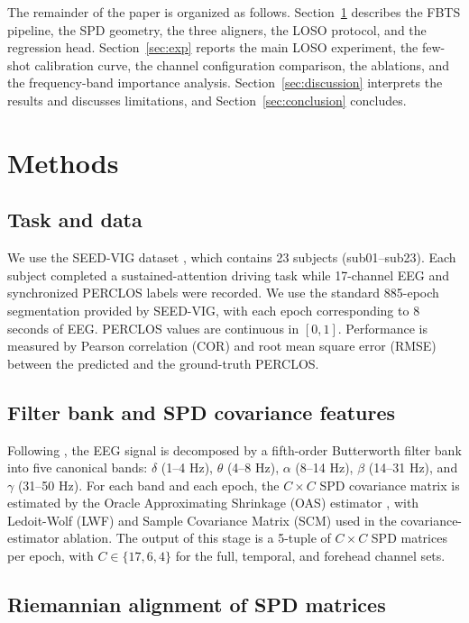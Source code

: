 \documentclass[journal,twoside,web]{ieeecolor2}
\begin{document}
The remainder of the paper is organized as follows. Section~\ref{sec:method}
describes the FBTS pipeline, the SPD geometry, the three aligners, the
LOSO protocol, and the regression head. Section~\ref{sec:exp} reports
the main LOSO experiment, the few-shot calibration curve, the channel
configuration comparison, the ablations, and the frequency-band importance
analysis.
Section~\ref{sec:discussion} interprets the results and discusses
limitations, and Section~\ref{sec:conclusion} concludes.

\section{Methods}
\label{sec:method}

\subsection{Task and data}

We use the SEED-VIG dataset \cite{zheng2017}, which contains 23
subjects (sub01--sub23). Each subject completed a sustained-attention
driving task while 17-channel EEG and synchronized PERCLOS labels were
recorded. We use the standard 885-epoch segmentation provided by
SEED-VIG, with each epoch corresponding to 8 seconds of EEG. PERCLOS
values are continuous in $[0, 1]$. Performance is measured by Pearson
correlation (COR) and root mean square error (RMSE) between the
predicted and the ground-truth PERCLOS.

\subsection{Filter bank and SPD covariance features}

Following \cite{zheng2017}, the EEG signal is decomposed by a
fifth-order Butterworth filter bank into five canonical bands:
$\delta$ (1--4 Hz), $\theta$ (4--8 Hz), $\alpha$ (8--14 Hz), $\beta$
(14--31 Hz), and $\gamma$ (31--50 Hz). For each band and each epoch,
the $C \times C$ SPD covariance matrix is estimated by the Oracle
Approximating Shrinkage (OAS) estimator \cite{chen2010oas}, with
Ledoit-Wolf (LWF) and Sample Covariance Matrix (SCM) used in the
covariance-estimator ablation. The output of this stage is a
5-tuple of $C \times C$ SPD matrices per epoch, with $C \in \{17, 6, 4\}$
for the full, temporal, and forehead channel sets.

\subsection{Riemannian alignment of SPD matrices}
\end{document}
